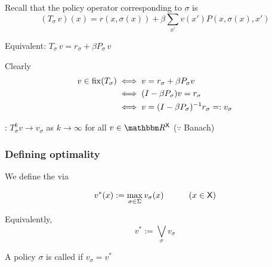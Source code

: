 \documentclass[dvipsnames]{beamer}
\begin{document}
\begin{frame}

    Recall that the policy operator corresponding to $\sigma$ is
    \begin{equation*}
        (T_\sigma \, v)(x) 
            = r(x, \sigma(x))
            + \beta
            \sum_{x'} v(x') P(x, \sigma(x), x')
    \end{equation*}

    Equivalent: $T_\sigma \, v = r_\sigma + \beta  P_\sigma \, v$

    \vspace{0.4em}
    Clearly 
    \begin{align*}
        v \in \operatorname{fix}(T_\sigma) 
        & \iff  v  = r_\sigma + \beta P_\sigma v
        \\
        & \iff  (I - \beta P_\sigma) v = r_\sigma
        \\
        & \iff  v = (I - \beta P_\sigma)^{-1}r_\sigma =: v_\sigma
    \end{align*}
    
        \vspace{0.5em}
        \vspace{0.5em}
    \Fact: $T_\sigma^k v \to v_\sigma$ as $k \to \infty$ for all $v \in \RR^\Xsf$
    \;\; ($\because$ Banach)

\end{frame}


\begin{frame}
    \frametitle{Defining optimality}
    
    We define the   via
    
    \begin{equation*}
        v^*(x) := \max_{\sigma \in \Sigma} v_\sigma(x)
        \quad \qquad (x \in \mathsf X)
    \end{equation*}

    \vspace{0.4em}
    \vspace{0.4em}

    Equivalently,
    \begin{equation*}
        v^* := \bigvee_\sigma v_\sigma
    \end{equation*}

    \vspace{0.4em}
    \vspace{0.4em}
    \vspace{0.4em}
    \vspace{0.4em}
    A policy $\sigma$ is called  if $v_\sigma = v^*$


\end{frame}
\end{document}
